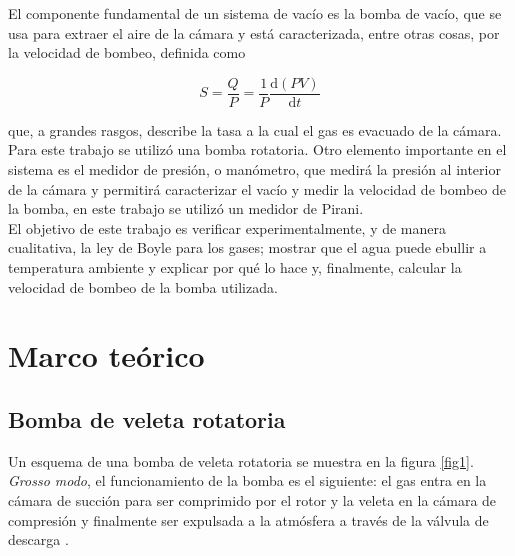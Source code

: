 \documentclass[final,5p,times,twocolumn, nopreprintline]{elsarticle}
\numberwithin{equation}{section}
\begin{document}
El componente fundamental de un sistema de vacío es la bomba de vacío, que se usa para extraer el aire de la cámara y está caracterizada, entre otras cosas, por la velocidad de bombeo, definida como \cite{van1965vacuum}

\begin{equation}
S=\dfrac{Q}{P}=\dfrac{1}{P}\dfrac{\mathrm{d}(PV)}{\mathrm{d}t} \label{eq1}
\end{equation}

que, a grandes rasgos, describe la tasa a la cual el gas es evacuado de la cámara. Para este trabajo se utilizó una bomba rotatoria. Otro elemento importante en el sistema es el medidor de presión, o manómetro, que medirá la presión al interior de la cámara y permitirá caracterizar el vacío y medir la velocidad de bombeo de la bomba, en este trabajo se utilizó un medidor de Pirani.\\

El objetivo de este trabajo es verificar experimentalmente, y de manera cualitativa, la ley de Boyle para los gases; mostrar que el agua puede ebullir a temperatura ambiente y explicar por qué lo hace y, finalmente, calcular la velocidad de bombeo de la bomba utilizada.

\section{Marco teórico} 

\subsection{Bomba de veleta rotatoria}
Un esquema de una bomba de veleta rotatoria se muestra en la figura \ref{fig1}. \emph{Grosso modo}, el funcionamiento de la bomba es el siguiente: el gas entra en la cámara de succión para ser comprimido por el rotor y la veleta en la cámara de compresión y finalmente ser expulsada a la atmósfera a través de la válvula de descarga \cite{o2023users}.


\end{document}
